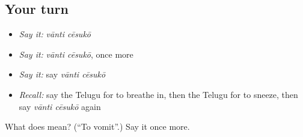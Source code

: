 \subsection*{Your turn}
\begin{itemize}
\raggedright
  \item \emph{Say it:} \emph{vānti cēsukō}
  \item \emph{Say it:} \emph{vānti cēsukō}, once more
  \item \emph{Say it:} say \emph{vānti cēsukō}
  \item \emph{Recall:} say the Telugu for to breathe in, then the Telugu for to sneeze, then say \emph{vānti cēsukō} again
\end{itemize}

\begin{tcolorbox}[breakable,colback=teal!4,colframe=teal!35!black,title={Before you move on}]
What does   mean? (\textquotedblleft{}To vomit\textquotedblright{}.) Say it once more.
\end{tcolorbox}
